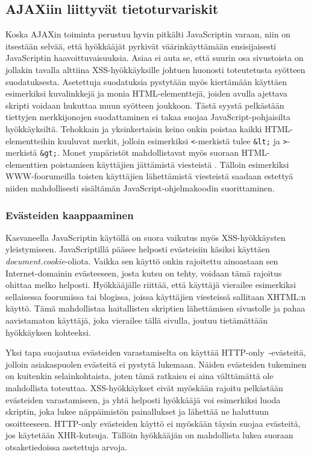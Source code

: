 \subsection{AJAXiin liittyvät tietoturvariskit}

Koska AJAXin toiminta perustuu hyvin pitkälti JavaScriptin varaan, niin on itsestään selvää, että hyökkääjät pyrkivät väärinkäyttämään ensisijaisesti JavaScriptin haavoittuvaisuuksia.  
Asiaa ei auta se, että suurin osa sivustoista on jollakin tavalla alttiina XSS-hyökkäyksille \cite{WEB2c} johtuen huonosti toteutetusta syötteen suodatuksesta. Asetettuja suodatuksia 
pystytään myös kiertämään käyttäen esimerkiksi kuvalinkkejä ja monia HTML-elementtejä, joiden avulla ajettava skripti voidaan hukuttaa muun syötteen joukkoon. Tästä syystä pelkästään 
tiettyjen merkkijonojen suodattaminen ei takaa suojaa JavaScript-pohjaisilta hyökkäyksiltä. Tehokkain ja yksinkertaisin keino onkin poistaa kaikki HTML-elementteihin kuuluvat merkit, 
jolloin esimerkiksi \texttt{<}-merkistä tulee \texttt{\&lt;} ja \texttt{>}-merkistä \texttt{\&gt;}. Monet ympäristöt mahdollistavat myös suoraan HTML-elementtien poistamisen käyttäjien
jättämistä viesteistä \cite{AJAX}. Tälloin esimerkiksi WWW-foorumeilla toisten käyttäjien lähettämistä viesteistä saadaan estettyä niiden mahdollisesti sisältämän JavaScript-ohjelmakoodin
suorittaminen.

\subsubsection{Evästeiden kaappaaminen}

Kasvaneella JavaScriptin käytöllä on suora vaikutus myös XSS-hyökkäysten yleistymiseen. JavaScriptillä pääsee helposti evästeisiin käsiksi käyttäen \emph{document.cookie}-oliota. 
Vaikka sen käyttö onkin rajoitettu ainoastaan sen Internet-domainin evästeeseen, josta kutsu on tehty, voidaan tämä rajoitus ohittaa melko helposti. Hyökkääjälle riittää, että käyttäjä 
vierailee esimerkiksi sellaisessa foorumissa tai blogissa, joissa käyttäjien viesteissä sallitaan XHTML:n käyttö. Tämä mahdollistaa haitallisten skriptien lähettämisen sivustolle ja pahaa
aavistamaton käyttäjä, joka vierailee tällä sivulla, joutuu tietämättään hyökkäyksen kohteeksi.

Yksi tapa suojautua evästeiden varastamiselta on käyttää HTTP-only~-evästeitä, jolloin asiakaspuolen evästeitä ei pystytä lukemaan. Näiden evästeiden tukeminen on kuitenkin selainkohtaista,
joten tämä ratkaisu ei aina välttämättä ole mahdollista toteuttaa. XSS-hyökkäykset eivät myöskään rajoitu pelkästään evästeiden varastamiseen, ja yhtä helposti hyökkääjä voi esimerkiksi
luoda skriptin, joka lukee näppäimistön painallukset ja lähettää ne haluttuun osoitteeseen. HTTP-only evästeiden käyttö ei myöskään täysin suojaa evästeitä, jos käytetään XHR-kutsuja. 
Tällöin hyökkääjän on mahdollista lukea suoraan otsaketiedoissa asetettuja arvoja.

